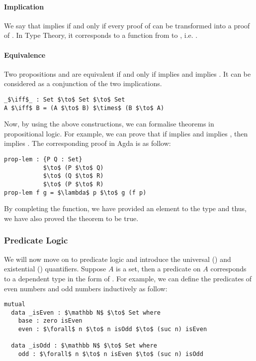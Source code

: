 \paragraph{Implication} We say that  implies  if and only
if every proof of  can be transformed into a proof of . In Type
Theory, it corresponds to a function from  to , i.e. . 

\paragraph{Equivalence} Two propositions  and
 are equivalent if and only if  implies  and  implies
. It can be considered as a conjunction of the two implications.
\begin{lstlisting}[mathescape=true,xleftmargin=.3\textwidth]
_$\iff$_ : Set $\to$ Set $\to$ Set
A $\iff$ B = (A $\to$ B) $\times$ (B $\to$ A)
\end{lstlisting} 

\par Now, by using the above constructions, we can formalise
 theorems in propositional logic. For example, we can prove that if  implies  and
 implies , then  implies . The corresponding
proof in Agda is as follow:
\begin{lstlisting}[mathescape=true,xleftmargin=.3\textwidth]
prop-lem : {P Q : Set} 
           $\to$ (P $\to$ Q) 
           $\to$ (Q $\to$ R) 
           $\to$ (P $\to$ R)
prop-lem f g = $\lambda$ p $\to$ g (f p)
\end{lstlisting} 

\par By completing the function, we have provided an element
to the type  and thus, we have
also proved the theorem to be true. 


\subsubsection{Predicate Logic} 
\par We will now move on to predicate logic and
introduce the universal (\mb{\forall}) and existential (\mb{\exists})
quantifiers. Suppose \(A\) is a set, then a predicate on \(A\) corresponds to a dependent type in the
form of . For example, we can
define the predicates of even numbers and odd numbers inductively as follow:
\begin{lstlisting}[mathescape=true,xleftmargin=.3\textwidth]
mutual
  data _isEven : $\mathbb N$ $\to$ Set where
    base : zero isEven
    even : $\forall$ n $\to$ n isOdd $\to$ (suc n) isEven

  data _isOdd : $\mathbb N$ $\to$ Set where
    odd : $\forall$ n $\to$ n isEven $\to$ (suc n) isOdd
\end{lstlisting} 

